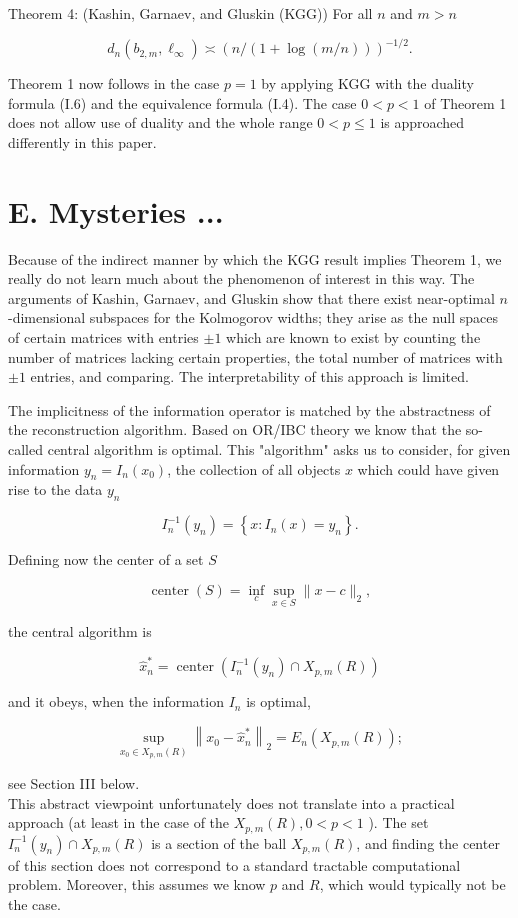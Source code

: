 \documentclass[10pt]{article}
\begin{document}
Theorem 4: (Kashin, Garnaev, and Gluskin (KGG)) For all $n$ and $m>n$

$$
d_{n}\left(b_{2, m}, \ell_{\infty}\right) \asymp(n /(1+\log (m / n)))^{-1 / 2} .
$$

Theorem 1 now follows in the case $p=1$ by applying KGG with the duality formula (I.6) and the equivalence formula (I.4). The case $0<p<1$ of Theorem 1 does not allow use of duality and the whole range $0<p \leq 1$ is approached differently in this paper.

\section*{E. Mysteries ...}
Because of the indirect manner by which the KGG result implies Theorem 1, we really do not learn much about the phenomenon of interest in this way. The arguments of Kashin, Garnaev, and Gluskin show that there exist near-optimal $n$-dimensional subspaces for the Kolmogorov widths; they arise as the null spaces of certain matrices with entries $\pm 1$ which are known to exist by counting the number of matrices lacking certain properties, the total number of matrices with $\pm 1$ entries, and comparing. The interpretability of this approach is limited.

The implicitness of the information operator is matched by the abstractness of the reconstruction algorithm. Based on OR/IBC theory we know that the so-called central algorithm is optimal. This "algorithm" asks us to consider, for given information $y_{n}=I_{n}\left(x_{0}\right)$, the collection of all objects $x$ which could have given rise to the data $y_{n}$

$$
I_{n}^{-1}\left(y_{n}\right)=\left\{x: I_{n}(x)=y_{n}\right\} .
$$

Defining now the center of a set $S$

$$
\operatorname{center}(S)=\inf _{c} \sup _{x \in S}\|x-c\|_{2},
$$

the central algorithm is

$$
\hat{x}_{n}^{*}=\operatorname{center}\left(I_{n}^{-1}\left(y_{n}\right) \cap X_{p, m}(R)\right)
$$

and it obeys, when the information $I_{n}$ is optimal,

$$
\sup _{x_{0} \in X_{p, m}(R)}\left\|x_{0}-\hat{x}_{n}^{*}\right\|_{2}=E_{n}\left(X_{p, m}(R)\right) ;
$$

see Section III below.\\
This abstract viewpoint unfortunately does not translate into a practical approach (at least in the case of the $X_{p, m}(R), 0< p<1$ ). The set $I_{n}^{-1}\left(y_{n}\right) \cap X_{p, m}(R)$ is a section of the ball $X_{p, m}(R)$, and finding the center of this section does not correspond to a standard tractable computational problem. Moreover, this assumes we know $p$ and $R$, which would typically not be the case.
\end{document}
